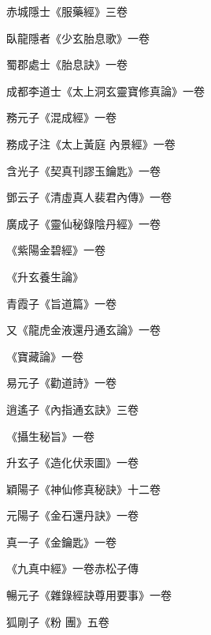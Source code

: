 \begin{pinyinscope}
 赤城隱士《服藥經》三卷



 臥龍隱者《少玄胎息歌》一卷



 蜀郡處士《胎息訣》一卷



 成都李道士《太上洞玄靈寶修真論》一卷



 務元子《混成經》一卷



 務成子注《太上黃庭
 內景經》一卷



 含光子《契真刊謬玉鑰匙》一卷



 鄧云子《清虛真人裴君內傳》一卷



 廣成子《靈仙秘錄陰丹經》一卷



 《紫陽金碧經》一卷



 《升玄養生論》



 青霞子《旨道篇》一卷



 又《龍虎金液還丹通玄論》一卷



 《寶藏論》一卷



 易元子《勸道詩》一卷



 逍遙子《內指通玄訣》三卷



 《攝生秘旨》一卷



 升玄子《造化伏汞圖》一卷



 穎陽子《神仙修真秘訣》十二卷



 元陽子《金石還丹訣》一卷



 真一子《金鑰匙》一卷



 《九真中經》一卷赤松子傳



 暢元子《雜錄經訣尊用要事》一卷



 狐剛子《粉
 團》五卷




\end{pinyinscope}
